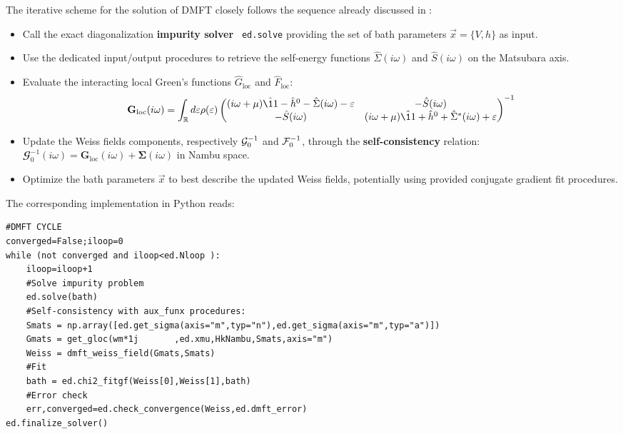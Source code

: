 \documentclass[edipack2.tex]{subfiles}
\begin{document}
The iterative scheme for the solution of DMFT closely follows the
sequence already discussed in :   
\begin{itemize}
\item Call the exact diagonalization {\bf impurity solver} {\tt
    ed.solve} providing the set of bath parameters $\vec{x}=\{V,h\}$  as input. 

\item Use the dedicated
  input/output \NAME procedures to retrieve the self-energy functions  
  $\hat{\Sigma}(i\omega)$ and $\hat{S}(i\omega)$ on the 
  Matsubara axis.
  
\item
  Evaluate the interacting local Green's functions $\hat{G}_\mathrm{loc}$ and
  $\hat{F}_\mathrm{loc}$:
  \begin{equation}
  {\mathbf G}_\mathrm{loc}(i\omega) =
  \int_\RRR d\e \rho(\e)
  \begin{pmatrix}
    (i\omega +\mu)\hat{\11} - \hat{h}^0 - \hat{\Sigma}(i\omega) -\e & -\hat{S}(i\omega) \\
    -\hat{S}(i\omega) & (i\omega +\mu)\hat{\11} + \hat{h}^0 +
    \hat{\Sigma}^*(i\omega) +\e\\
  \end{pmatrix}^{-1}
\end{equation}

\item Update the Weiss fields components, respectively 
  ${\cal G}_0^{-1}$ and ${\cal F}_0^{-1}$, through the {\bf self-con\-sis\-ten\-cy}
  relation: $\mathbfcal{G}^{-1}_0(i\omega) = {\mathbf G}_\mathrm{loc}(i\omega) +
  {\mathbf \Sigma}(i\omega)$ in Nambu space.
  
\item Optimize the bath parameters $\vec{x}$ to best describe the updated
    Weiss fields, potentially using \NAME provided conjugate gradient  fit
    procedures.
  \end{itemize}
%
The corresponding implementation in Python reads:
\begin{lstlisting}[style=mypython,numbers=none,basicstyle={\scriptsize\ttfamily}]
#DMFT CYCLE
converged=False;iloop=0
while (not converged and iloop<ed.Nloop ):
    iloop=iloop+1
    #Solve impurity problem
    ed.solve(bath)    
    #Self-consistency with aux_funx procedures:
    Smats = np.array([ed.get_sigma(axis="m",typ="n"),ed.get_sigma(axis="m",typ="a")])    
    Gmats = get_gloc(wm*1j       ,ed.xmu,HkNambu,Smats,axis="m") 
    Weiss = dmft_weiss_field(Gmats,Smats)                            
    #Fit
    bath = ed.chi2_fitgf(Weiss[0],Weiss[1],bath)
    #Error check
    err,converged=ed.check_convergence(Weiss,ed.dmft_error)
ed.finalize_solver()
\end{lstlisting}
\end{document}
